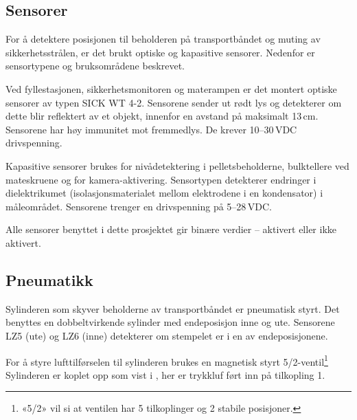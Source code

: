\documentclass[Visionprosjekt.tex]{subfiles}
\begin{document}
\subsection{Sensorer}


For å detektere posisjonen til beholderen på transportbåndet og muting av sikkerhetsstrålen, er det brukt optiske og  kapasitive sensorer. %
Nedenfor er sensortypene og bruksområdene beskrevet. 


\begin{description}[style=multiline,leftmargin=24mm]
	\item[Optiske sensorer] 
            Ved fyllestasjonen, sikkerhetsmonitoren og materampen er det montert optiske sensorer av typen SICK WT 4-2. Sensorene sender ut rødt lys og detekterer om dette blir reflektert av et objekt, innenfor en avstand på maksimalt 13\,cm. Sensorene har høy immunitet mot fremmedlys. De krever 10--30\,VDC drivspenning.
	\item[Kapasitive sensorer] 
            Kapasitive sensorer brukes for nivådetektering i pelletsbeholderne, bulktellere ved mateskruene og for kamera-aktivering. Sensortypen detekterer endringer i dielektrikumet (isolasjonsmaterialet mellom elektrodene i en kondensator) i måleområdet. 
 Sensorene trenger en drivspenning på 5--28\,VDC. 
\end{description}

Alle sensorer benyttet i dette prosjektet gir binære verdier -- aktivert eller ikke aktivert.





\subsection{Pneumatikk}

Sylinderen som skyver beholderne av transportbåndet er pneumatisk styrt. Det benyttes en dobbeltvirkende sylinder med endeposisjon inne og ute. Sensorene LZ5 (ute) og LZ6 (inne) detekterer om stempelet er i en av endeposisjonene.

For å styre  lufttilførselen til sylinderen brukes en magnetisk styrt 5/2-ventil\footnote{«5/2» vil si at ventilen har 5  tilkoplinger og  2 stabile posisjoner.} %
Sylinderen er koplet opp som vist i , her er trykkluf ført inn på tilkopling 1.
\end{document}
